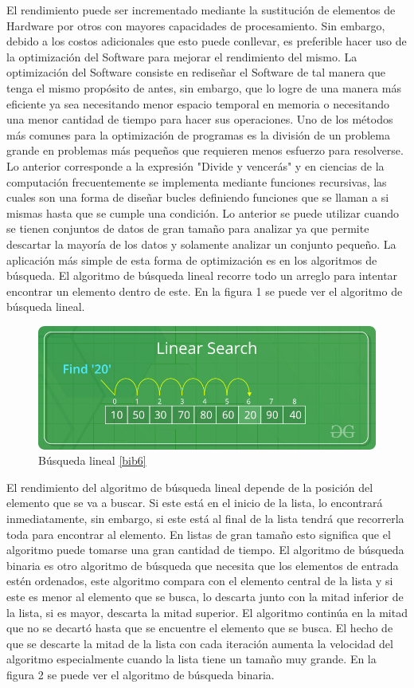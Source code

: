 El rendimiento puede ser incrementado mediante la sustitución de elementos de Hardware por otros con mayores capacidades de procesamiento. Sin embargo, debido a los costos adicionales que esto puede conllevar, es preferible hacer uso de la optimización del Software para mejorar el rendimiento del mismo. La optimización del Software consiste en rediseñar el Software de tal manera que tenga el mismo propósito de antes, sin embargo, que lo logre de una manera más eficiente ya sea necesitando menor espacio temporal en memoria o necesitando una menor cantidad de tiempo para hacer sus operaciones. Uno de los métodos más comunes para la optimización de programas es la división de un problema grande en problemas más pequeños que requieren menos esfuerzo para resolverse. Lo anterior corresponde a la expresión "Divide y vencerás" y en ciencias de la computación frecuentemente se implementa mediante funciones recursivas, las cuales son una forma de diseñar bucles definiendo funciones que se llaman a si mismas hasta que se cumple una condición. Lo anterior se puede utilizar cuando se tienen conjuntos de datos de gran tamaño para analizar ya que permite descartar la mayoría de los datos y solamente analizar un conjunto pequeño. La aplicación más simple de esta forma de optimización es en los algoritmos de búsqueda. El algoritmo de búsqueda lineal recorre todo un arreglo para intentar encontrar un elemento dentro de este. En la figura 1 se puede ver el algoritmo de búsqueda lineal.
\begin{figure}[!htbp]
    \centering
    \includegraphics[width=.6\textwidth,height=.3\textwidth]{figures/linear_search.png}
    \caption{Búsqueda lineal \ref{bib6}}
    \label{fig:my_label}
\end{figure}
El rendimiento del algoritmo de búsqueda lineal depende de la posición del elemento que se va a buscar. Si este está en el inicio de la lista, lo encontrará inmediatamente, sin embargo, si este está al final de la lista tendrá que recorrerla toda para encontrar al elemento. En listas de gran tamaño esto significa que el algoritmo puede tomarse una gran cantidad de tiempo. El algoritmo de búsqueda binaria es otro algoritmo de búsqueda que necesita que los elementos de entrada estén ordenados, este algoritmo compara con el elemento central de la lista y si este es menor al elemento que se busca, lo descarta junto con la mitad inferior de la lista, si es mayor, descarta la mitad superior. El algoritmo continúa en la mitad que no se decartó hasta que se encuentre el elemento que se busca. El hecho de que se descarte la mitad de la lista con cada iteración aumenta la velocidad del algoritmo especialmente cuando la lista tiene un tamaño muy grande. En la figura 2 se puede ver el algoritmo de búsqueda binaria.
